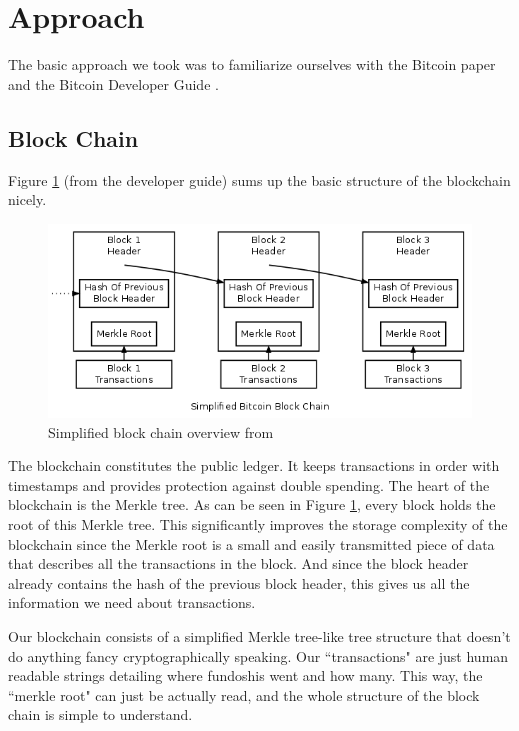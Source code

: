 \documentclass[12pt]{article}
\begin{document}
\section{Approach}\label{approach}
The basic approach we took was to familiarize ourselves with the Bitcoin paper\cite{nakamoto:bitcoin} and the Bitcoin Developer Guide \cite{dev:guide}. 

\subsection{Block Chain}\label{blockchain}
Figure \ref{figblockchain} (from the developer guide) sums up the basic structure of the blockchain nicely. 

\begin{figure}[h!]\label{figblockchain}
	\centering
	\includegraphics[scale=0.5]{en-blockchain-overview.png}
	\caption{Simplified block chain overview from \cite{dev:guide}}
\end{figure}

The blockchain constitutes the public ledger. It keeps transactions in order with timestamps and provides protection against double spending. The heart of the blockchain is the Merkle tree. As can be seen in Figure \ref{figblockchain}, every block holds the root of this Merkle tree. This significantly improves the storage complexity of the blockchain since the Merkle root is a small and easily transmitted piece of data that describes all the transactions in the block. And since the block header already contains the hash of the previous block header, this gives us all the information we need about transactions. 


Our blockchain consists of a simplified Merkle tree-like tree structure that doesn't do anything fancy cryptographically speaking. Our ``transactions" are just human readable strings detailing where fundoshis went and how many. This way, the ``merkle root" can just be actually read, and the whole structure of the block chain is simple to understand.
\end{document}
